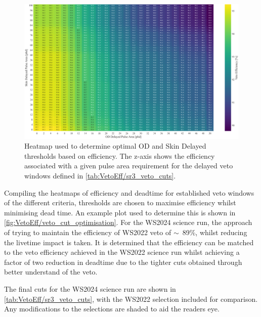 \begin{figure}
	\centering
	\includegraphics[width=\textwidth]{figures/VetoEfficiency/Heatmap600us_ODDelayedSkinDelayedThresholds.png}
	\caption{Heatmap used to determine optimal OD and Skin Delayed thresholds based on efficiency. The z-axis shows the efficiency associated with a given pulse area requirement for the delayed veto windows defined in \autoref{tab:VetoEff/sr3_veto_cuts}.}
	\label{fig:VetoEff/od_prompt_veto_heatmap}
\end{figure}

Compiling the heatmaps of efficiency and deadtime for established veto windows of the different criteria, thresholds are chosen to maximise efficiency whilst minimising dead time. An example plot used to determine this is shown in \autoref{fig:VetoEff/veto_cut_optimisation}.
For the WS2024 science run, the approach of trying to maintain the efficiency of WS2022 veto of $\sim$~89\%, whilst reducing the livetime impact is taken. It is determined that the efficiency can be matched to the veto efficiency achieved in the WS2022 science run whilst achieving a factor of two reduction in deadtime due to the tighter cuts obtained through better understand of the veto.

\noindent
The final cuts for the WS2024 science run are shown in \autoref{tab:VetoEff/sr3_veto_cuts}, with the WS2022 selection included for comparison. Any modifications to the selections are shaded to aid the readers eye.

